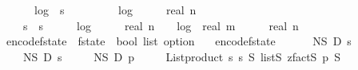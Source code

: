 \begin{isabellebody}
\ \ \ \ {}\ {\isacharasterisk}{\kern0pt}\ log\ {}\ {\isacharparenleft}{\kern0pt}s\ {\isacharplus}{\kern0pt}\ {}{\isacharparenright}{\kern0pt}\ {\isacharplus}{\kern0pt}\isanewline
\ \ \ \ {}\ {\isacharasterisk}{\kern0pt}\ log\ {}\ {\isacharparenleft}{\kern0pt}{}\ {\isacharplus}{\kern0pt}\ {}\ {\isacharasterisk}{\kern0pt}\ real\ n{\isacharparenright}{\kern0pt}\ {\isacharplus}{\kern0pt}\isanewline
\ \ \ \ s\ {\isacharasterisk}{\kern0pt}\ s\ {\isacharasterisk}{\kern0pt}\ {\isacharparenleft}{\kern0pt}{}{}\ {\isacharplus}{\kern0pt}\ {}\ {\isacharasterisk}{\kern0pt}\ log\ {}\ {\isacharparenleft}{\kern0pt}{}\ {\isacharplus}{\kern0pt}\ {}\ {\isacharasterisk}{\kern0pt}\ real\ n{\isacharparenright}{\kern0pt}\ {\isacharplus}{\kern0pt}\ {}\ {\isacharasterisk}{\kern0pt}\ log\ {}\ {\isacharparenleft}{\kern0pt}real\ m\ {\isacharasterisk}{\kern0pt}\ {\isacharparenleft}{\kern0pt}{}\ {\isacharplus}{\kern0pt}\ {}\ {\isacharasterisk}{\kern0pt}\ real\ n{\isacharparenright}{\kern0pt}\ {\isacharplus}{\kern0pt}\ {}\ {\isacharparenright}{\kern0pt}{\isacharparenright}{\kern0pt}{\isacharparenright}{\kern0pt}{\isachardoublequoteclose}\isanewline
\isanewline
{}\isamarkupfalse%
\ encode{\isacharunderscore}{\kern0pt}f{}{\isacharunderscore}{\kern0pt}state\ {\isacharcolon}{\kern0pt}{\isacharcolon}{\kern0pt}\ {\isachardoublequoteopen}f{}{\isacharunderscore}{\kern0pt}state\ {\isasymRightarrow}\ bool\ list\ option{\isachardoublequoteclose}\ \isanewline
\ \ {\isachardoublequoteopen}encode{\isacharunderscore}{\kern0pt}f{}{\isacharunderscore}{\kern0pt}state\ {\isacharequal}{\kern0pt}\ \isanewline
\ \ \ \ N\isactrlsub S\ {\isasymtimes}\isactrlsub D\ {\isacharparenleft}{\kern0pt}{\isasymlambda}s\ \isanewline
\ \ \ \ N\isactrlsub S\ {\isasymtimes}\isactrlsub D\ {\isacharparenleft}{\kern0pt}{\isasymlambda}s\ \isanewline
\ \ \ \ N\isactrlsub S\ {\isasymtimes}\isactrlsub D\ {\isacharparenleft}{\kern0pt}{\isasymlambda}p{\isachardot}{\kern0pt}\ \isanewline
\ \ \ \ {\isacharparenleft}{\kern0pt}List{\isachardot}{\kern0pt}product\ {\isacharbrackleft}{\kern0pt}{}{\isachardot}{\kern0pt}{\isachardot}{\kern0pt}{\isacharless}{\kern0pt}s\ {\isacharbrackleft}{\kern0pt}{}{\isachardot}{\kern0pt}{\isachardot}{\kern0pt}{\isacharless}{\kern0pt}s\ {\isasymrightarrow}\isactrlsub S\ {\isacharparenleft}{\kern0pt}list\isactrlsub S\ {\isacharparenleft}{\kern0pt}zfact\isactrlsub S\ p{\isacharparenright}{\kern0pt}{\isacharparenright}{\kern0pt}{\isacharparenright}{\kern0pt}\ {\isasymtimes}\isactrlsub S\isanewline

\end{isabellebody}
